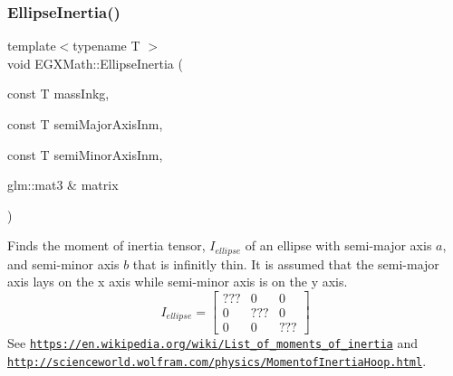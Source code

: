 \subsubsection{\texorpdfstring{Ellipse\+Inertia()}{EllipseInertia()}\hspace{0.1cm}{\footnotesize\ttfamily [3/3]}}
{\footnotesize\ttfamily template$<$typename T $>$ \\
void E\+G\+X\+Math\+::\+Ellipse\+Inertia (\begin{DoxyParamCaption}\item[{const T}]{mass\+Inkg,  }\item[{const T}]{semi\+Major\+Axis\+Inm,  }\item[{const T}]{semi\+Minor\+Axis\+Inm,  }\item[{glm\+::mat3 \&}]{matrix }\end{DoxyParamCaption})}



Finds the moment of inertia tensor, $I_{ellipse}$ of an ellipse with semi-\/major axis $a$, and semi-\/minor axis $b$ that is infinitly thin. It is assumed that the semi-\/major axis lays on the x axis while semi-\/minor axis is on the y axis. \[ I_{ellipse}=\begin{bmatrix} ??? & 0 & 0\\ 0 & ??? & 0\\ 0 & 0 & ??? \end{bmatrix} \] See \href{https://en.wikipedia.org/wiki/List_of_moments_of_inertia}{\tt https\+://en.\+wikipedia.\+org/wiki/\+List\+\_\+of\+\_\+moments\+\_\+of\+\_\+inertia} and \href{http://scienceworld.wolfram.com/physics/MomentofInertiaHoop.html}{\tt http\+://scienceworld.\+wolfram.\+com/physics/\+Momentof\+Inertia\+Hoop.\+html}. 


